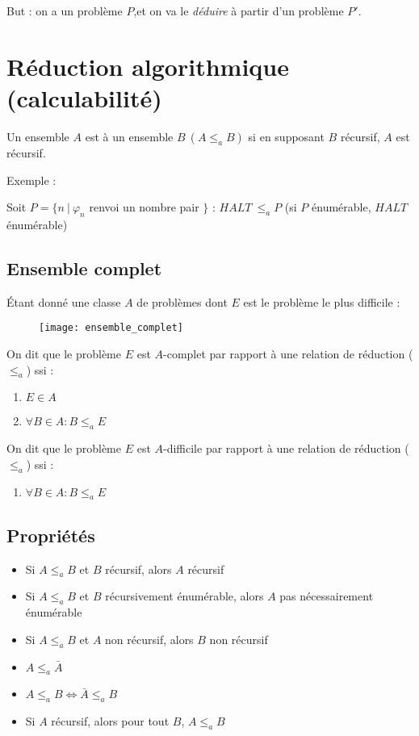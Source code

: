 But : on a un problème $P$,et on va le \textit{déduire} à partir d'un problème $P'$.

\section{Réduction algorithmique (calculabilité)}

Un ensemble $A$ est  à un ensemble $B \ (A \leq_a B)$ si en supposant $B$ récursif, $A$ est récursif.

Exemple :

Soit $P = \{n \ | \ \varphi_n$ renvoi un nombre pair $\}$ : $HALT \ \leq_a P$ (si $P$ énumérable, $HALT$ énumérable)

\subsection{Ensemble complet}

Étant donné une classe $A$ de problèmes dont $E$ est le problème le plus difficile :
\begin{figure}[H]
    \centering
    \texttt{[image: ensemble\_complet]}
\end{figure}
On dit que le problème $E$ est $A$-complet par rapport à une relation de réduction ($\leq_a$) ssi :
\begin{enumerate}
\item $E \in A$
\item $\forall B \in A : B \leq_a E$
\end{enumerate}
On dit que le problème $E$ est $A$-difficile par rapport à une relation de réduction ($\leq_a$) ssi :
\begin{enumerate}
\item $\forall B \in A : B \leq_a E$
\end{enumerate}

\subsection{Propriétés}

\begin{itemize}
\item Si $A \leq_a B$ et $B$ récursif, alors $A$ récursif
\item Si $A \leq_a B$ et $B$ récursivement énumérable, alors $A$ pas nécessairement énumérable
\item Si $A \leq_a B$ et $A$ non récursif, alors $B$ non récursif
\item $A \leq_a \bar{A}$
\item $A \leq_a B \Leftrightarrow \bar{A} \leq_a B$
\item Si $A$ récursif, alors pour tout $B$, $A \leq_a B$
\end{itemize}

